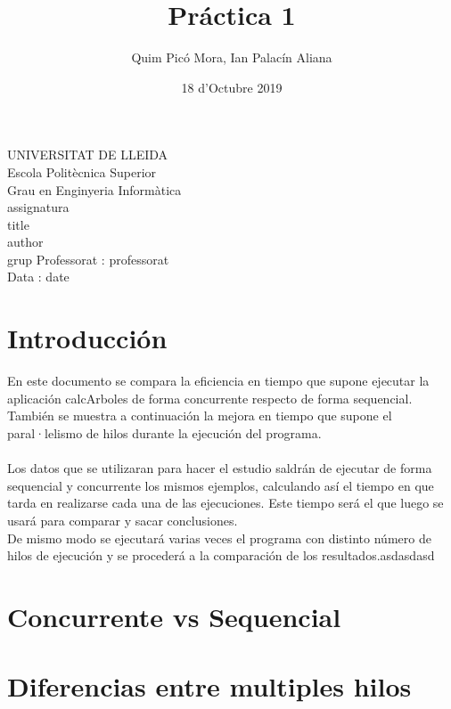 \documentclass{article}
\title{Práctica 1}
\author{Quim Picó Mora, Ian Palacín Aliana}
\date{18 d'Octubre 2019}
\renewcommand{\maketitle}{ %
	\begin{titlepage}
		\raggedright{UNIVERSITAT DE LLEIDA \\
			Escola Politècnica Superior \\
			Grau en Enginyeria Informàtica\\
			\1assignatura\\}
		\vspace{5cm}
		\centering\huge{\5title \\}
		\vspace{3cm}
		\large{\6author} \\
		\normalsize{\3grup}
		\vfill
		Professorat : \4professorat \\
		Data : \7date
\end{titlepage}}
\begin{document}
	\maketitle
	\thispagestyle{empty}
	
	\newpage
	\tableofcontents
	\newpage
	




\section{Introducción}

En este documento se compara la eficiencia en tiempo que supone ejecutar la aplicación calcArboles de forma concurrente respecto de forma sequencial. También se muestra a continuación la mejora en tiempo que supone el paral·lelismo de hilos durante la ejecución del programa.
\\\\
Los datos que se utilizaran para hacer el estudio saldrán de ejecutar de forma sequencial y concurrente los mismos ejemplos, calculando así el tiempo en que tarda en realizarse cada una de las ejecuciones. Este tiempo será el que luego se usará para comparar y sacar conclusiones.\\
De mismo modo se ejecutará varias veces el programa con distinto número de hilos de ejecución y se procederá a la comparación de los resultados.asdasdasd


\section{Concurrente vs Sequencial}

\section{Diferencias entre multiples hilos}
\end{document}
